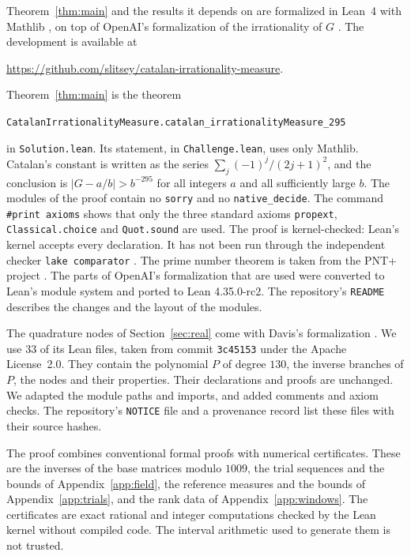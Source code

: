 \documentclass[11pt]{amsart}
\newcommand{\FormalizationURL}{https://github.com/slitsey/catalan-irrationality-measure}
\newcommand{\FormalizationLink}{\url{\FormalizationURL}}
\theoremstyle{definition}
\theoremstyle{remark}
\numberwithin{equation}{section}
\newcommand{\lean}[1]{\texttt{#1}}
\begin{document}
Theorem~\ref{thm:main} and the results it depends on are formalized in Lean~4 \cite{Lean4} with Mathlib \cite{Mathlib}, on top of OpenAI's
formalization of the irrationality of $G$ \cite{OpenAI2026}. The development is available at
\begin{center}
\FormalizationLink.
\end{center}
Theorem~\ref{thm:main} is the theorem
\begin{center}
{\small\texttt{CatalanIrrationalityMeasure.catalan\_irrationalityMeasure\_295}}
\end{center}
in \lean{Solution.lean}. Its statement, in \lean{Challenge.lean}, uses only Mathlib. Catalan's constant is
written as the series $\sum_j(-1)^j/(2j+1)^2$, and the conclusion is $|G-a/b|>b^{-295}$ for all integers $a$
and all sufficiently large $b$. The modules of the proof contain no \lean{sorry} and no \lean{native\_decide}. The command
\lean{\#print axioms} shows that only the three standard axioms \lean{propext}, \lean{Classical.choice} and
\lean{Quot.sound} are used. The proof is kernel-checked: Lean's kernel accepts every declaration. It has not been run through the independent checker \lean{lake comparator} \cite{Comparator}.
The prime number theorem is taken from the PNT+ project \cite{PNTPlus}. The parts of
OpenAI's formalization that are used were converted to Lean's module system and ported to Lean
4.35.0-rc2. The repository's \texttt{README} describes the changes and the layout of the modules.

The quadrature nodes of Section~\ref{sec:real} come with Davis's formalization \cite{Davis2026}. We use 33
of its Lean files, taken from commit \texttt{3c45153} under the Apache License~2.0. They contain the
polynomial $P$ of degree $130$, the inverse branches of $P$, the nodes and their properties. Their
declarations and proofs are unchanged. We adapted the module paths and imports, and added comments and
axiom checks. The repository's \texttt{NOTICE} file and a provenance record list these files with their source
hashes.

The proof combines conventional formal proofs with numerical certificates. These are the inverses of the base
matrices modulo $1009$, the trial sequences and the bounds of Appendix~\ref{app:field}, the reference measures
and the bounds of Appendix~\ref{app:trials}, and the rank data of Appendix~\ref{app:windows}. The certificates are
exact rational and integer computations checked by the Lean kernel without compiled code. The interval
arithmetic used to generate them \cite{Arb} is not trusted.
\end{document}
